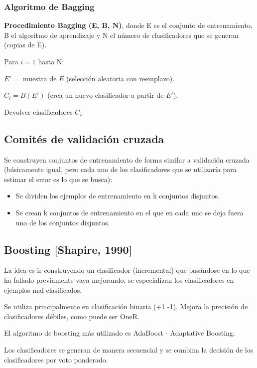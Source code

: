 \documentclass[12pt, twoside, openright]{report} %
\begin{document}
\subsubsection{Algoritmo de Bagging}
\textbf{Procedimiento Bagging (E, B, N)}, donde E es el conjunto de entrenamiento, B el algoritmo de aprendizaje y N el número de clasificadores que se generan (copias de E).

Para $i = 1$ hasta N:

\hspace{6mm} $E' =$ muestra de $E$ (selección aleatoria con reemplazo).

\hspace{6mm} $C_i = B(E')$ (crea un nuevo clasificador a partir de $E'$).

Devolver clasificadores $C_i$.

\subsection{Comités de validación cruzada}
Se construyen conjuntos de entrenamiento de forma similar a validación cruzada (básicamente igual, pero cada uno de los clasificadores que se utilizaría para estimar el error es lo que se busca):
\begin{itemize}
	\item Se dividen los ejemplos de entrenamiento en k conjuntos disjuntos.
	\item Se crean k conjuntos de entrenamiento en el que en cada uno se deja fuera uno de los conjuntos disjuntos.
\end{itemize}

\subsection{Boosting [Shapire, 1990]}
La idea es ir construyendo un clasificador (incremental) que basándose en lo que ha fallado previamente vaya mejorando, se especializan los clasificadores en ejemplos mal clasificados.

Se utiliza principalmente en clasificación binaria (+1 -1). Mejora la precisión de clasificadores débiles, como puede ser OneR.

El algoritmo de boosting más utilizado es AdaBoost - Adaptative Boosting.

Los clasificadores se generan de manera secuencial y se combina la decisión de los clasificadores por voto ponderado.
\end{document}
